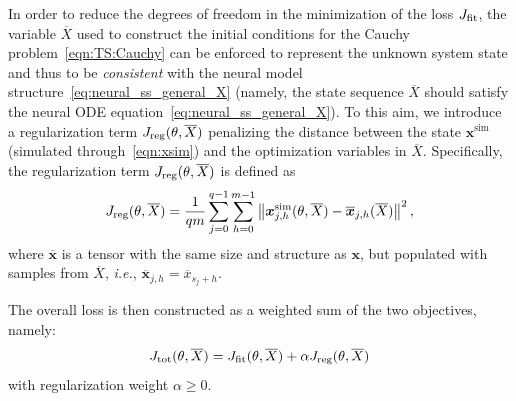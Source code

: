 \documentclass{article} %
\newcommand{\batchsize}{q}
\newcommand{\seqlen}{m}
\newcommand{\tens}[1]{\bm{#1}}
\newcommand{\hidden}[1]{\overline{#1}}
\newcommand{\norm}[1]{\left\lVert#1\right\rVert}
\begin{document}
In order to reduce the degrees of freedom in the minimization  of the loss $J_{\rm fit}$, 
the variable  $\hidden{X}$ used to construct the  initial conditions for the Cauchy problem~\eqref{eqn:TS:Cauchy} can be enforced to  represent the unknown system state and thus to be \emph{consistent} with
the neural model structure~\eqref{eq:neural_ss_general_X} (namely, the state sequence  $\hidden{X}$ should satisfy the neural ODE equation~\eqref{eq:neural_ss_general_X}). To this aim, we introduce a regularization term $J_{\rm reg}(\theta, \hidden{X})$  penalizing the distance between the  state ${\tens{x}}^{\mathrm{sim}}$ (simulated through~\eqref{eqn:xsim}) and the optimization variables in $\hidden{X}$. Specifically, the regularization term $J_{\rm reg}(\theta, \hidden{X})$  is defined as 
 \begin{equation}
 \label{eq:simulation_cost_regularizer}
 J_{\rm reg}(\theta,\hidden{X}) = \frac{1}{\batchsize \seqlen}\sum_{j=0}^{\batchsize-1} \sum_{h=0}^{\seqlen-1} \norm{{\tens{x}}^{\rm sim}_{j,h}(\theta, \hidden{X}) - \hidden{{\tens{x}}}_{j,h}(\hidden{X})}^2, 
 \end{equation}
where 
 $\hidden{\tens{x}}$  is a tensor with the same size and structure as ${\tens{x}}$, but populated with  samples from $\hidden{X}$, \emph{i.e.},
 ${\hidden{\tens{x}}}_{j,h} = \hidden{x}_{s_{j}+h}$.

The overall loss is then constructed as a weighted sum of the two objectives, namely:
\begin{align} \label{eqn:Jtot}
J_{\rm tot }(\theta,\hidden{X}) = J_{\rm fit}(\theta,\hidden{X}) +\alpha J_{\rm reg}(\theta, \hidden{X})
\end{align}
with regularization weight $\alpha \geq 0$.
\end{document}
